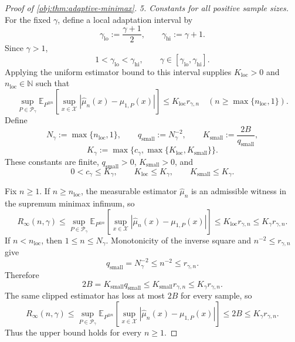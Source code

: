 \begin{proof}[Proof of \cref{obj:thm:adaptive-minimax}]
\emph{5. Constants for all positive sample sizes.}
For the fixed \(\gamma\), define a local adaptation interval by
\[
\gamma_{\mathrm{lo}}:=\frac{\gamma+1}{2},
\qquad
\gamma_{\mathrm{hi}}:=\gamma+1.
\]
Since \(\gamma>1\),
\[
1<\gamma_{\mathrm{lo}}<\gamma_{\mathrm{hi}},
\qquad
\gamma\in[\gamma_{\mathrm{lo}},\gamma_{\mathrm{hi}}].
\]
Applying the uniform estimator bound to this interval supplies \(K_{\mathrm{loc}}>0\) and \(n_{\mathrm{loc}}\in\mathbb N\) such that
\[
\sup_{P\in\mathcal P_\gamma}
\mathbb E_{P^{\otimes n}}
\left[
\sup_{x\in\mathcal X}
|\widehat\mu_n(x)-\mu_{1,P}(x)|
\right]
\le K_{\mathrm{loc}}r_{\gamma,n}
\quad(n\ge\max\{n_{\mathrm{loc}},1\}).
\]
Define
\[
N_\gamma:=\max\{n_{\mathrm{loc}},1\},
\qquad
q_{\mathrm{small}}:=N_\gamma^{-2},
\qquad
K_{\mathrm{small}}:=\frac{2B}{q_{\mathrm{small}}},
\]
\[
K_\gamma
:=
\max\{c_\gamma,\max\{K_{\mathrm{loc}},K_{\mathrm{small}}\}\}.
\]
These constants are finite, \(q_{\mathrm{small}}>0\), \(K_{\mathrm{small}}>0\), and
\[
0<c_\gamma\le K_\gamma,
\qquad
K_{\mathrm{loc}}\le K_\gamma,
\qquad
K_{\mathrm{small}}\le K_\gamma.
\]

Fix \(n\ge1\). If \(n\ge n_{\mathrm{loc}}\), the measurable estimator \(\widehat\mu_n\) is an admissible witness in the supremum minimax infimum, so
\[
R_\infty(n,\gamma)
\le
\sup_{P\in\mathcal P_\gamma}
\mathbb E_{P^{\otimes n}}
\left[
\sup_{x\in\mathcal X}
|\widehat\mu_n(x)-\mu_{1,P}(x)|
\right]
\le K_{\mathrm{loc}}r_{\gamma,n}
\le K_\gamma r_{\gamma,n}.
\]
If \(n<n_{\mathrm{loc}}\), then \(1\le n\le N_\gamma\). Monotonicity of the inverse square and \(n^{-2}\le r_{\gamma,n}\) give
\[
q_{\mathrm{small}}
=N_\gamma^{-2}
\le n^{-2}
\le r_{\gamma,n}.
\]
Therefore
\[
2B
=K_{\mathrm{small}}q_{\mathrm{small}}
\le K_{\mathrm{small}}r_{\gamma,n}
\le K_\gamma r_{\gamma,n}.
\]
The same clipped estimator has loss at most \(2B\) for every sample, so
\[
R_\infty(n,\gamma)
\le
\sup_{P\in\mathcal P_\gamma}
\mathbb E_{P^{\otimes n}}
\left[
\sup_{x\in\mathcal X}
|\widehat\mu_n(x)-\mu_{1,P}(x)|
\right]
\le2B
\le K_\gamma r_{\gamma,n}.
\]
Thus the upper bound holds for every \(n\ge1\).


\end{proof}
